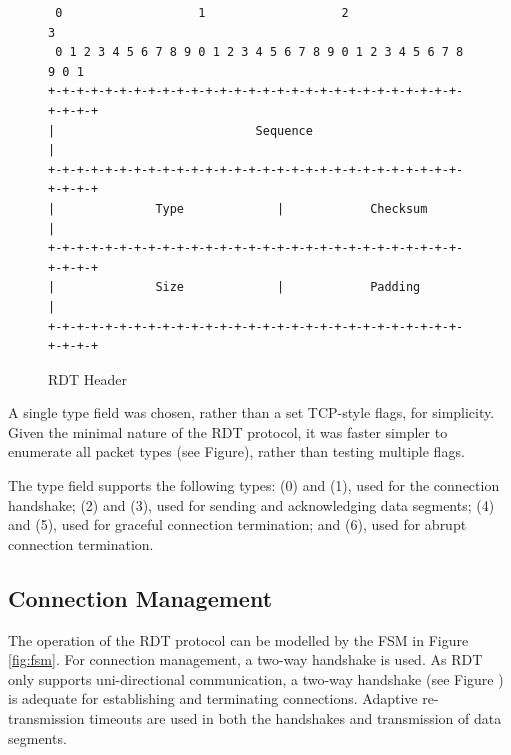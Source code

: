 \begin{figure}
\begin{center}
\begin{verbatim}
 0                   1                   2                   3  
 0 1 2 3 4 5 6 7 8 9 0 1 2 3 4 5 6 7 8 9 0 1 2 3 4 5 6 7 8 9 0 1
+-+-+-+-+-+-+-+-+-+-+-+-+-+-+-+-+-+-+-+-+-+-+-+-+-+-+-+-+-+-+-+-+
|                            Sequence                           |
+-+-+-+-+-+-+-+-+-+-+-+-+-+-+-+-+-+-+-+-+-+-+-+-+-+-+-+-+-+-+-+-+
|              Type             |            Checksum           |
+-+-+-+-+-+-+-+-+-+-+-+-+-+-+-+-+-+-+-+-+-+-+-+-+-+-+-+-+-+-+-+-+
|              Size             |            Padding            |
+-+-+-+-+-+-+-+-+-+-+-+-+-+-+-+-+-+-+-+-+-+-+-+-+-+-+-+-+-+-+-+-+
\end{verbatim}
\end{center}
\caption{RDT Header}\label{fig:header}
\end{figure}

A single type field was chosen, rather than a set TCP-style flags, for simplicity. Given the minimal nature of the RDT protocol, it was faster simpler to enumerate all packet types (see Figure), rather than testing multiple flags.

The type field supports the following types:  (0) and  (1), used for the connection handshake;  (2) and  (3), used for sending and acknowledging data segments;  (4) and  (5), used for graceful connection termination; and  (6), used for abrupt connection termination.

\subsection{Connection Management}

The operation of the RDT protocol can be modelled by the FSM in Figure \ref{fig:fsm}. For connection management, a two-way handshake is used. As RDT only supports uni-directional communication, a two-way handshake (see Figure ) is adequate for establishing and terminating connections. Adaptive re-transmission timeouts are used in both the handshakes and transmission of data segments.

